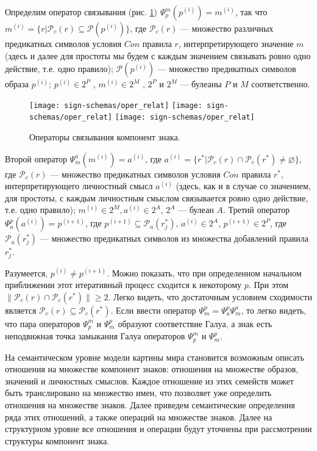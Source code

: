 \documentclass[12pt]{scrartcl}
\begin{document}
	Определим оператор связывания (рис. \ref{fig:linkers}) $\Psi_p^m(p^{(i)})=m^{(i)}$, так что $m^{(i)}=\{r|\mathcal{P}_c(r)\subseteq \mathcal{P}(p^{(i)})\}$, где $\mathcal{P}_c(r)$ --- множество различных предикатных символов условия $Con$ правила $r$, интерпретирующего значение $m$ (здесь и далее для простоты мы будем с каждым значением связывать ровно одно действие, т.е. одно правило); $\mathcal{P}(p^{(i)})$ --- множество предикатных символов образа $p^{(i)}$; $p^{(i)}\in 2^P$ , $m^{(i)}\in 2^M$ , $2^P$ и $2^M$ --- булеаны $P$ и $M$ соответственно. 
	
	\begin{figure}
		\label{fig:linkers}
		\centering
		\texttt{[image: sign-schemas/oper\_relat]}
		\texttt{[image: sign-schemas/oper\_relat]}
		\texttt{[image: sign-schemas/oper\_relat]}
		\caption{Операторы связывания компонент знака.}		
	\end{figure}
	
	Второй оператор	$\Psi_m^a(m^{(i)})=a^{(i)}$, где $a^{(i)}=\{r^*|\mathcal{P}_c(r)\cap \mathcal{P}_c(r^*)\not=\varnothing\}$, где $\mathcal{P}_c(r)$ --- множество предикатных символов условия $Con$ правила $r^*$, интерпретирующего личностный смысл $a^{(i)}$ (здесь, как и в случае со значением, для простоты, с каждым личностным смыслом связывается ровно одно действие, т.е. одно правило); $m^{(i)}\in 2^M, a^{(i)}\in 2^A$, $2^A$ --- булеан $A$. Третий оператор $\Psi_a^p(a^{(i)})=p^{(i+1)}$, где $p^{(i+1)}\subseteq \mathcal{P}_a(r_j^*)$, $a^{(i)}\in 2^A$, $p^{(i+1)}\in 2^P$, где $\mathcal{P}_a(r_j^*)$ --- множество предикатных символов из множества добавлений правила $r_j^*$.
	
	Разумеется, $p^{(i)}\not = p^{(i+1)}$. Можно показать, что при определенном начальном приближении этот итеративный процесс сходится к некоторому $p$. При этом $\|\mathcal P_c(r)\cap\mathcal P_c(r^*)\|\geq 2$. Легко видеть, что достаточным условием сходимости является $\mathcal P_c(r)\subseteq\mathcal P_c(r^*)$. Если ввести оператор $\Psi_m^p=\Psi_a^p\Psi_m^a$, то легко видеть, что пара операторов $\Psi_p^m$ и $\Psi_m^p$ образуют соответствие Галуа, а знак есть неподвижная точка замыкания Галуа операторов $\Psi_p^m$ и $\Psi_m^p$.
	
	На семантическом уровне модели картины мира становится возможным описать отношения на множестве компонент знаков: отношения на множестве образов, значений и личностных смыслов. Каждое отношение из этих семейств может быть транслировано на множество имен, что позволяет уже определить отношения на множестве знаков. Далее приведем семантические определения ряда этих отношений, а также операций на множестве знаков. Далее на структурном уровне все отношения и операции будут уточнены при рассмотрении структуры компонент знака.
		
\end{document}

